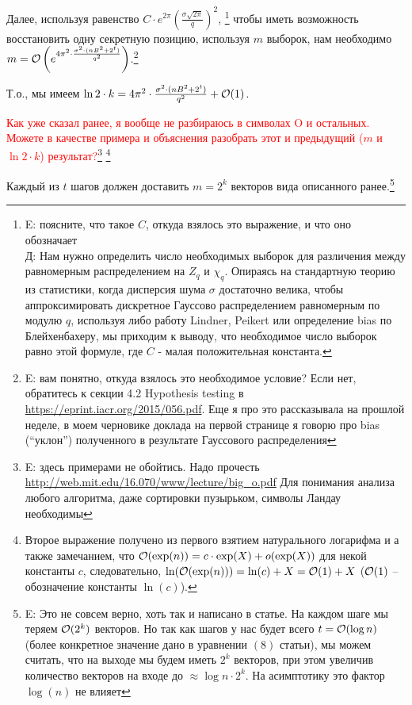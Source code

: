 \documentclass[a4paper,11pt]{article}
\begin{document}
Далее, используя равенство $C \cdot e^{2\pi}(\frac{\sigma \sqrt{2\pi}}{q})^2$, \footnote{E: поясните, что такое $C$, откуда взялось это выражение, и что оно обозначает \\ Д: Нам нужно определить число необходимых выборок для различения между равномерным распределением на $Z_q$ и $\chi_q$. Опираясь на стандартную теорию из статистики, когда дисперсия шума $\sigma$ достаточно велика, чтобы аппроксимировать дискретное Гауссово распределением равномерным по модулю $q$, используя либо работу Lindner, Peikert или определение bias по Блейхенбахеру, мы приходим к выводу, что необходимое число выборок равно этой формуле, где $C$ - малая положительная константа.} чтобы иметь возможность восстановить одну секретную позицию, используя $m$ выборок, нам необходимо $m=\mathcal{O}\left(e^{4\pi^2 \cdot \frac{\sigma^2 \cdot (nB^2+2^t)}{q^2}}\right)$.\footnote{E: вам понятно, откуда взялось это необходимое условие? Если нет, обратитесь к секции 4.2 Hypothesis testing в \url{https://eprint.iacr.org/2015/056.pdf}. Еще я про это рассказывала на прошлой неделе, в моем черновике доклада на первой странице я говорю про bias (``уклон'') полученного в результате Гауссового распределения }

Т.о., мы имеем $\ln{2} \cdot k = 4\pi^2 \cdot \frac{\sigma^2 \cdot (nB^2+2^t)}{q^2} + \mathcal{O}(1)$.

\textcolor{red}{Как уже сказал ранее, я вообще не разбираюсь в символах O и остальных. Можете в качестве примера и объяснения разобрать этот и предыдущий ($m$ и $\ln{2} \cdot k$) результат?}\footnote{E: здесь примерами не обойтись. Надо прочесть \url{http://web.mit.edu/16.070/www/lecture/big_o.pdf}
Для понимания анализа любого алгоритма, даже сортировки пузырьком, символы Ландау необходимы
}
\footnote{Второе выражение получено из первого взятием натурального логарифма и а также замечанием, что $\mathcal{O}(\exp(n)) = c \cdot \exp(X) + o(\exp(X))$ для некой константы $c$, следовательно, $ \ln(\mathcal{O}(\exp(n)) ) = \ln(c) + X = \mathcal{O}(1) + X$ ($\mathcal{O}(1)$ -- обозначение константы $\ln(c)$).  }

Каждый из $t$ шагов должен доставить $m=2^k$ векторов вида описанного ранее.\footnote{E: Это не совсем верно, хоть так и написано в статье. На каждом шаге мы теряем $\mathcal{O}(2^k)$ векторов. Но так как шагов у нас будет всего $t = \mathcal{O}(\log n)$ (более конкретное значение дано в уравнении $(8)$ статьи), мы можем считать, что на выходе мы будем иметь $2^k$ векторов, при этом увеличив количество векторов на входе до $\approx \log n \cdot 2^k$. На асимптотику это фактор $\log(n)$ не влияет}
\end{document}
